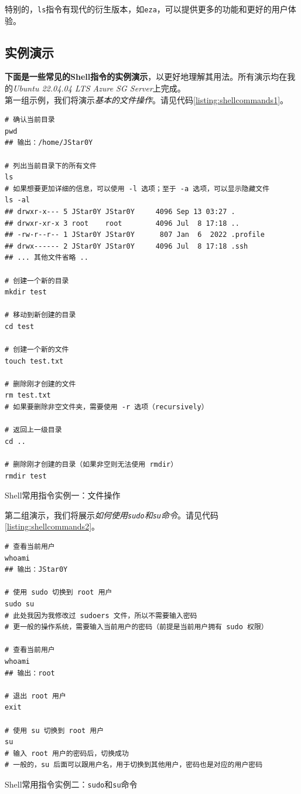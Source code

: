 特别的，\texttt{ls}指令有现代的衍生版本，如\texttt{eza}，可以提供更多的功能和更好的用户体验。

\subsection{实例演示}
\label{cp:shellcommands-demo}

\textbf{下面是一些常见的Shell指令的实例演示}，以更好地理解其用法。所有演示均在我的\textit{Ubuntu 22.04.04 LTS Azure SG Server}上完成。\\

第一组示例，我们将演示\textit{基本的文件操作}。请见代码\ref{listing:shellcommands1}。

\begin{longlisting}
    \begin{verbatim}
# 确认当前目录
pwd
## 输出：/home/JStar0Y

# 列出当前目录下的所有文件
ls
# 如果想要更加详细的信息，可以使用 -l 选项；至于 -a 选项，可以显示隐藏文件
ls -al
## drwxr-x--- 5 JStar0Y JStar0Y     4096 Sep 13 03:27 .
## drwxr-xr-x 3 root    root        4096 Jul  8 17:18 ..
## -rw-r--r-- 1 JStar0Y JStar0Y      807 Jan  6  2022 .profile
## drwx------ 2 JStar0Y JStar0Y     4096 Jul  8 17:18 .ssh
## ... 其他文件省略 ..

# 创建一个新的目录
mkdir test

# 移动到新创建的目录
cd test

# 创建一个新的文件
touch test.txt

# 删除刚才创建的文件
rm test.txt
# 如果要删除非空文件夹，需要使用 -r 选项（recursively）

# 返回上一级目录
cd ..

# 删除刚才创建的目录（如果非空则无法使用 rmdir）
rmdir test
    \end{verbatim}
    \caption{Shell常用指令实例一：文件操作}
    \label{listing:shellcommands1}
\end{longlisting}

第二组演示，我们将展示\textit{如何使用\texttt{sudo}和\texttt{su}命令}。请见代码\ref{listing:shellcommands2}。

\begin{longlisting}
    \begin{verbatim}
# 查看当前用户
whoami
## 输出：JStar0Y

# 使用 sudo 切换到 root 用户
sudo su
# 此处我因为我修改过 sudoers 文件，所以不需要输入密码
# 更一般的操作系统，需要输入当前用户的密码（前提是当前用户拥有 sudo 权限）

# 查看当前用户
whoami
## 输出：root

# 退出 root 用户
exit

# 使用 su 切换到 root 用户
su
# 输入 root 用户的密码后，切换成功
# 一般的，su 后面可以跟用户名，用于切换到其他用户，密码也是对应的用户密码
    \end{verbatim}
    \caption{Shell常用指令实例二：\texttt{sudo}和\texttt{su}命令}
    \label{listing:shellcommands2}
\end{longlisting}

